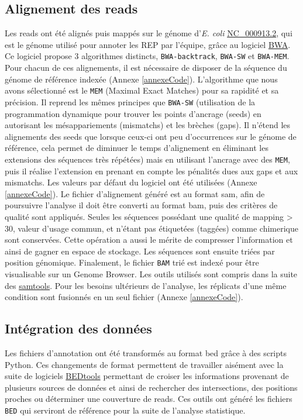 \documentclass[12pt,a4paper]{report}
\begin{document}
\begin{onehalfspace}
\section*{Alignement des reads}
Les reads ont été alignés puis mappés sur le génome d'\textit{E. coli} \href{http://www.ncbi.nlm.nih.gov/nuccore/NC_000913.2}{NC\_000913.2}, qui est le génome utilisé pour annoter les REP par l'équipe, grâce au logiciel \href{http://bio-bwa.sourceforge.net/}{BWA}.  Ce logiciel propose 3 algorithmes distincts, \texttt{BWA-backtrack}, \texttt{BWA-SW} et \texttt{BWA-MEM}. Pour chacun de ces alignements, il est nécessaire de disposer de la séquence du génome de référence indexée (Annexe \ref{annexeCode}). 
L'algorithme que nous avons sélectionné est le \texttt{MEM} (Maximal Exact Matches) pour sa rapidité et sa précision. Il reprend les mêmes principes que \texttt{BWA-SW} (utilisation de la programmation dynamique pour trouver les points d'ancrage (seeds) en autorisant les mésappariements (mismatchs) et les brèches (gaps). Il n'étend les alignements des seeds que lorsque ceux-ci ont peu d'occurrences sur le génome de référence, cela permet de diminuer le temps d'alignement en éliminant les extensions des séquences très répétées) mais en utilisant l'ancrage avec des \texttt{MEM}, puis il réalise l'extension en prenant en compte les pénalités dues aux gaps et aux mismatchs. Les valeurs par défaut du logiciel ont été utilisées (Annexe \ref{annexeCode}).
Le fichier d'alignement généré est au format \gls{sam}, afin de poursuivre l'analyse il doit être converti au format \gls{bam}, puis des critères de qualité sont appliqués. Seules les séquences possédant une qualité de mapping > 30, valeur d'usage commun, et n'étant pas étiquetées (taggées) comme \gls{chimerique} sont conservées. Cette opération a aussi le mérite de compresser l'information et ainsi de gagner en espace de stockage. Les séquences sont ensuite triées par position génomique. Finalement, le fichier \texttt{BAM} trié est indexé pour être visualisable sur un Genome Browser. Les outils utilisés sont compris dans la suite des \href{http://samtools.sourceforge.net/samtools.shtml}{samtools}. Pour les besoins ultérieurs de l'analyse, les réplicats d'une même condition sont fusionnés en un seul fichier (Annexe \ref{annexeCode}).

\subsection*{Intégration des données}
Les fichiers d'annotation ont été transformés au format \gls{bed} grâce à des scripts Python.
Ces changements de format permettent de travailler aisément avec la suite de logiciels \href{http://bedtools.readthedocs.org/en/latest/}{BEDtools} permettant de croiser les informations provenant de plusieurs sources de données et ainsi de rechercher des intersections, des positions proches ou déterminer une \gls{couverture} de reads. Ces outils ont généré les fichiers \texttt{BED} qui serviront de référence pour la suite de l'analyse statistique.


\end{onehalfspace}
\end{document}
